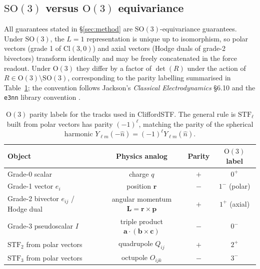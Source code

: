 
\subsection{\texorpdfstring{$\mathrm{SO}(3)$}{SO(3)} versus \texorpdfstring{$\mathrm{O}(3)$}{O(3)} equivariance}\label{supp:so3_o3}

All guarantees stated in \S\ref{sec:method} are $\mathrm{SO}(3)$-equivariance guarantees. Under $\mathrm{SO}(3)$, the $L{=}1$ representation is unique up to isomorphism, so polar vectors (grade 1 of $\mathrm{Cl}(3,0)$) and axial vectors (Hodge duals of grade-2 bivectors) transform identically and may be freely concatenated in the force readout. Under $\mathrm{O}(3)$ they differ by a factor of $\det(R)$ under the action of $R \in \mathrm{O}(3)\setminus\mathrm{SO}(3)$, corresponding to the parity labelling summarised in Table~\ref{tab:parity}; the convention follows Jackson's \emph{Classical Electrodynamics} \S6.10 and the \texttt{e3nn} library convention \citep{geiger2022e3nn}.

\begin{table}[h]
\centering
\caption{$\mathrm{O}(3)$ parity labels for the tracks used in CliffordSTF. The general rule is $\mathrm{STF}_\ell$ built from polar vectors has parity $(-1)^\ell$, matching the parity of the spherical harmonic $Y_{\ell m}(-\hat{n}) = (-1)^\ell Y_{\ell m}(\hat{n})$.}\label{tab:parity}
\small
\begin{tabular}{lccc}
\toprule
Object & Physics analog & Parity & $\mathrm{O}(3)$ label \\
\midrule
Grade-0 scalar & charge $q$ & $+$ & $0^+$ \\
Grade-1 vector $e_i$ & position $\mathbf{r}$ & $-$ & $1^-$ (polar) \\
Grade-2 bivector $e_{ij}$ / Hodge dual & angular momentum $\mathbf{L}{=}\mathbf{r}\times\mathbf{p}$ & $+$ & $1^+$ (axial) \\
Grade-3 pseudoscalar $I$ & triple product $\mathbf{a}\cdot(\mathbf{b}\times\mathbf{c})$ & $-$ & $0^-$ \\
$\mathrm{STF}_2$ from polar vectors & quadrupole $Q_{ij}$ & $+$ & $2^+$ \\
$\mathrm{STF}_3$ from polar vectors & octupole $O_{ijk}$ & $-$ & $3^-$ \\
\bottomrule
\end{tabular}
\end{table}

